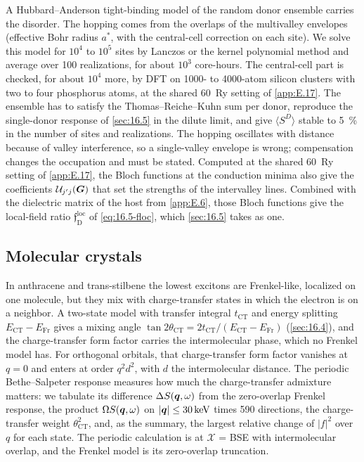 A Hubbard--Anderson tight-binding model of the random donor ensemble carries the disorder. The hopping comes from the overlaps of the multivalley envelopes (effective Bohr radius $a^*$, with the central-cell correction on each site). We solve this model for $10^4$ to $10^5$ sites by Lanczos or the kernel polynomial method and average over 100 realizations, for about $10^3$ core-hours. The central-cell part is checked, for about $10^4$ more, by DFT on 1000- to 4000-atom silicon clusters with two to four phosphorus atoms, at the shared \SI{60}{Ry} setting of \cref{app:E.17}. The ensemble has to satisfy the Thomas--Reiche--Kuhn sum per donor, reproduce the single-donor response of \cref{sec:16.5} in the dilute limit, and give $\langle S^D\rangle$ stable to \SI{5}{\percent} in the number of sites and realizations. The hopping oscillates with distance because of valley interference, so a single-valley envelope is wrong; compensation changes the occupation and must be stated. Computed at the shared \SI{60}{Ry} setting of \cref{app:E.17}, the Bloch functions at the conduction minima also give the coefficients $\mathcal{U}_{j'j}(\bm{G})$ that set the strengths of the intervalley lines. Combined with the dielectric matrix of the host from \cref{app:E.6}, those Bloch functions give the local-field ratio $\mathfrak{f}^{\mathrm{loc}}_{\mathrm{D}}$ of \cref{eq:16.5-floc}, which \cref{sec:16.5} takes as one.

\subsection{Molecular crystals}

In anthracene and trans-stilbene the lowest excitons are Frenkel-like, localized on one molecule, but they mix with charge-transfer states in which the electron is on a neighbor. A two-state model with transfer integral $t_{\mathrm{CT}}$ and energy splitting $E_{\mathrm{CT}} - E_{\mathrm{Fr}}$ gives a mixing angle $\tan2\theta_{\mathrm{CT}} = 2t_{\mathrm{CT}}/(E_{\mathrm{CT}} - E_{\mathrm{Fr}})$ (\cref{sec:16.4}), and the charge-transfer form factor carries the intermolecular phase, which no Frenkel model has. For orthogonal orbitals, that charge-transfer form factor vanishes at $q = 0$ and enters at order $q^2d^2$, with $d$ the intermolecular distance. The periodic Bethe--Salpeter response measures how much the charge-transfer admixture matters: we tabulate its difference $\Delta S(\bm{q},\omega)$ from the zero-overlap Frenkel response, the product $\Omega S(\bm{q},\omega)$ on $|\bm{q}| \le \SI{30}{keV}$ times 590 directions, the charge-transfer weight $\theta_{\mathrm{CT}}^2$, and, as the summary, the largest relative change of $|f|^2$ over $q$ for each state. The periodic calculation is at $\mathcal{X}$ = BSE with intermolecular overlap, and the Frenkel model is its zero-overlap truncation.

